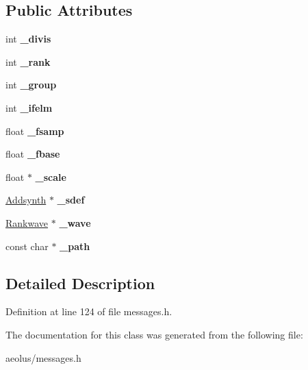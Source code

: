 \subsection*{Public Attributes}
\begin{DoxyCompactItemize}
\item 
\mbox{\label{class_m__def__rank_a6d6e22c467deed3670e9b8124e4c112a}} 
int {\bfseries \+\_\+divis}
\item 
\mbox{\label{class_m__def__rank_a18727c86bd865ff6b5a0807ffcf3a28c}} 
int {\bfseries \+\_\+rank}
\item 
\mbox{\label{class_m__def__rank_af944dc58fc98a579a4e021421b195749}} 
int {\bfseries \+\_\+group}
\item 
\mbox{\label{class_m__def__rank_a251499d7a4762ff7631c36252c025dd5}} 
int {\bfseries \+\_\+ifelm}
\item 
\mbox{\label{class_m__def__rank_aa19ac96d821a908b294bd271cb7dad34}} 
float {\bfseries \+\_\+fsamp}
\item 
\mbox{\label{class_m__def__rank_ad18f01f7e91fbde90393566781c79c85}} 
float {\bfseries \+\_\+fbase}
\item 
\mbox{\label{class_m__def__rank_aaa5ae4e57344363f66f67a22f44cb09c}} 
float $\ast$ {\bfseries \+\_\+scale}
\item 
\mbox{\label{class_m__def__rank_a7680bdfdb5c2398979d1b66ffe54e0f7}} 
\hyperlink{class_addsynth}{Addsynth} $\ast$ {\bfseries \+\_\+sdef}
\item 
\mbox{\label{class_m__def__rank_a732ba1efae7370144b4d37cf302bfdb4}} 
\hyperlink{class_rankwave}{Rankwave} $\ast$ {\bfseries \+\_\+wave}
\item 
\mbox{\label{class_m__def__rank_a6f98480ac384b2d164352b05a66a3523}} 
const char $\ast$ {\bfseries \+\_\+path}
\end{DoxyCompactItemize}


\subsection{Detailed Description}


Definition at line 124 of file messages.\+h.



The documentation for this class was generated from the following file\+:\begin{DoxyCompactItemize}
\item 
aeolus/messages.\+h\end{DoxyCompactItemize}
